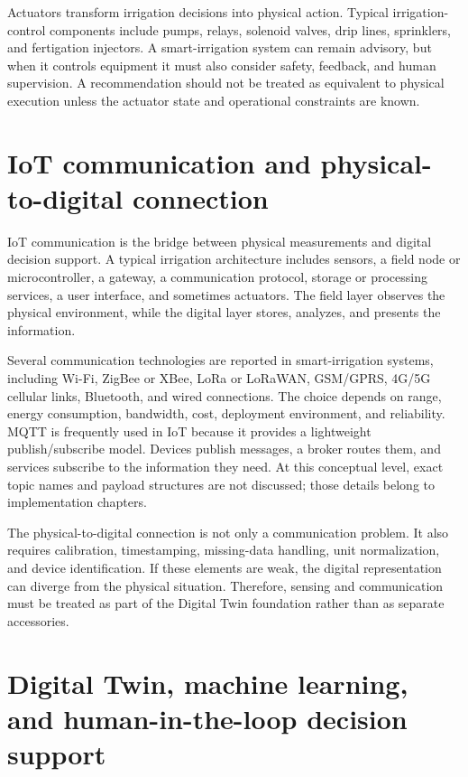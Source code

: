 Actuators transform irrigation decisions into physical action. Typical irrigation-control components include pumps, relays, solenoid valves, drip lines, sprinklers, and fertigation injectors. A smart-irrigation system can remain advisory, but when it controls equipment it must also consider safety, feedback, and human supervision. A recommendation should not be treated as equivalent to physical execution unless the actuator state and operational constraints are known.

\section{IoT communication and physical-to-digital connection}

IoT communication is the bridge between physical measurements and digital decision support. A typical irrigation architecture includes sensors, a field node or microcontroller, a gateway, a communication protocol, storage or processing services, a user interface, and sometimes actuators. The field layer observes the physical environment, while the digital layer stores, analyzes, and presents the information.

Several communication technologies are reported in smart-irrigation systems, including Wi-Fi, ZigBee or XBee, LoRa or LoRaWAN, GSM/GPRS, 4G/5G cellular links, Bluetooth, and wired connections. The choice depends on range, energy consumption, bandwidth, cost, deployment environment, and reliability. MQTT is frequently used in IoT because it provides a lightweight publish/subscribe model. Devices publish messages, a broker routes them, and services subscribe to the information they need. At this conceptual level, exact topic names and payload structures are not discussed; those details belong to implementation chapters.

The physical-to-digital connection is not only a communication problem. It also requires calibration, timestamping, missing-data handling, unit normalization, and device identification. If these elements are weak, the digital representation can diverge from the physical situation. Therefore, sensing and communication must be treated as part of the Digital Twin foundation rather than as separate accessories.

\section{Digital Twin, machine learning, and human-in-the-loop decision support}


